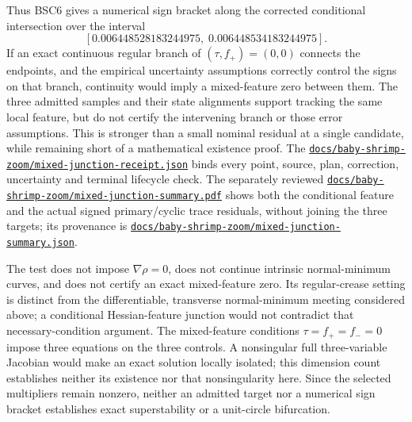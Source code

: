 \documentclass[11pt,letterpaper]{article}
\newcommand{\repourl}{https://github.com/tdj28/neural-shrimp}
\newcommand{\memorymixedrepo}[1]{\href{\repourl/blob/e859fdafe5d72c9f18c050374336f3a114babb10/#1}{\nolinkurl{#1}}}
\begin{document}
Thus BSC6 gives a numerical sign bracket along the corrected conditional intersection over the interval
\[
 [0.006448528183244975,\;0.006448534183244975].
\]
If an exact continuous regular branch of $(\tau,f_+)=(0,0)$ connects the endpoints,
and the empirical uncertainty assumptions correctly control the signs on that branch, continuity
would imply a mixed-feature zero between them. The three admitted samples and their state
alignments support tracking the same local feature, but do not certify the intervening branch or
those error assumptions. This is stronger than a small nominal residual at a single candidate,
while remaining short of a mathematical existence proof.
The \memorymixedrepo{docs/baby-shrimp-zoom/mixed-junction-receipt.json}
binds every point, source, plan, correction, uncertainty and terminal lifecycle check.
The separately reviewed \memorymixedrepo{docs/baby-shrimp-zoom/mixed-junction-summary.pdf}
shows both the conditional feature and the actual signed primary/cyclic trace residuals, without
joining the three targets; its provenance is
\memorymixedrepo{docs/baby-shrimp-zoom/mixed-junction-summary.json}.

The test does not impose $\nabla\rho=0$, does not continue intrinsic
normal-minimum curves, and does not certify an exact mixed-feature zero.
Its regular-crease setting is distinct from the differentiable,
transverse normal-minimum meeting considered above; a conditional
Hessian-feature junction would not contradict that necessary-condition
argument. The mixed-feature conditions $\tau=f_+=f_-=0$ impose three
equations on the three controls. A nonsingular full three-variable
Jacobian would make an exact solution locally isolated; this dimension
count establishes neither its existence nor that nonsingularity here.
Since the selected multipliers remain nonzero, neither an
admitted target nor a numerical sign bracket establishes exact
superstability or a unit-circle bifurcation.
\end{document}
